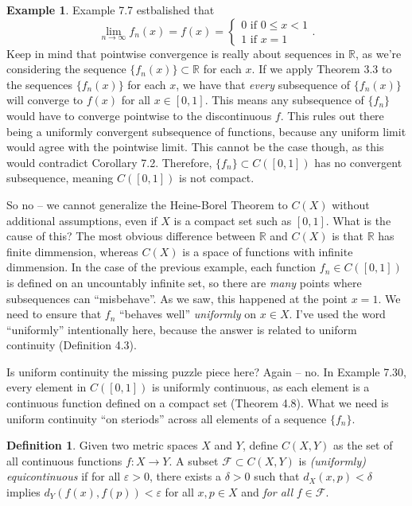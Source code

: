 \documentclass{article}
\newcommand{\R}{\mathbb{R}}
\theoremstyle{definition}
\newtheorem{definition}{Definition}[section]
\newtheorem{example}{Example}[section]
\begin{document}
\begin{example}
	Example 7.7 estbalished that $$ \lim\limits_{n\to\infty}f_n(x)=f(x)=\begin{cases}
		0\text{ if } 0\le x<1\\1\text{ if } x=1
	\end{cases} .$$ 
	Keep in mind that pointwise convergence is really about sequences in $\R$, as we're considering the sequence $\{f_n(x)\} \subset \R$ for each $x$. If we apply Theorem 3.3 to the sequences $\{f_n(x)\}$ for each $x$, we have that \textit{every} subsequence of $\{f_n(x)\}$ will converge to $f(x)$ for all $x\in[0,1]$. This means any subsequence of $\{f_n\}$ would have to converge pointwise to the discontinuous $f$. This rules out there being a uniformly convergent subsequence of functions, because any uniform limit would agree with the pointwise limit. This cannot  be the case though, as this would contradict Corollary 7.2. Therefore, $\{f_n\}\subset C([0,1])$ has no convergent subsequence, meaning $C([0,1])$ is not compact.
	\end{example}
	
	So no -- we cannot generalize the Heine-Borel Theorem to $C(X)$ without additional assumptions, even if $X$ is a compact set such as $[0,1]$. What is the cause of this? The most obvious difference between $\R$ and $C(X)$ is that $\R$ has finite dimmension, whereas $C(X)$ is a space of functions with infinite dimmension. In the case of the previous example, each function $f_n\in C([0,1])$ is defined on an uncountably infinite set, so there are \textit{many} points where subsequences can ``misbehave''. As we saw, this happened at the point $x = 1$. We need to ensure that $f_n$ ``behaves well'' \textit{uniformly} on $x\in X$. I've used the word ``uniformly'' intentionally here, because the answer is related to uniform continuity (Definition 4.3). 
	
	Is uniform continuity the missing puzzle piece here? Again -- no. In Example 7.30, every element in $C([0,1])$ is uniformly continuous, as each element is a continuous function defined on a compact set (Theorem 4.8). What we need is uniform continuity ``on steriods'' across all elements of a sequence $\{f_n\}$.
	
	\begin{definition}\label{def}
		Given two metric spaces $X$ and $Y$, define $C(X,Y)$ as the set of all continuous functions $f:X\to Y$. A subset $\mathcal F\subset C(X,Y)$ is \textit{\color{red}(uniformly) equicontinuous} if for all $\varepsilon > 0$, there exists a $\delta > 0$ such that $d_X(x,p) < \delta$ implies $d_Y(f(x),f(p))<\varepsilon$ for all $x,p\in X$ and \textit{for all} $f \in \mathcal F$.
	\end{definition}
	
\end{document}
